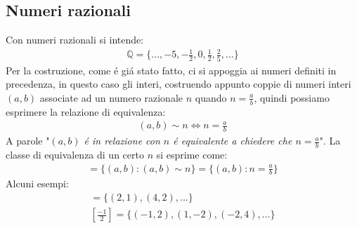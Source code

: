 \documentclass[twoside]{article} %
\begin{document}
	\newpage	
	\subsection{Numeri razionali}
	Con numeri razionali si intende:
	\begin{gather*}
	 	\mathbb{Q}=\Big\{...,-5,-\frac{1}{2},0,\frac{1}{2},\frac{2}{5}, ...\Big\}
	 \end{gather*}
	 Per la costruzione, come \'e gi\'a stato fatto, ci si appoggia ai numeri definiti in precedenza, in questo caso gli interi, costruendo appunto coppie di numeri interi $(a,b)$ associate ad un numero razionale $n$ quando $n=\frac{a}{b}$, quindi possiamo esprimere la relazione di equivalenza:
	 \begin{gather*}
	 	(a,b)\sim n\Leftrightarrow n=\frac{a}{b}
	 \end{gather*}
	 A parole "\textit{$(a,b)$ \'e in relazione con $n$ \'e equivalente a chiedere che $n=\frac{a}{b}$}". La classe di equivalenza di un certo $n$ si esprime come:
	\begin{gather*}
		[n]=\{(a,b):(a,b)\sim n\}=\Big\{(a,b):n=\frac{a}{b}\Big\}
	\end{gather*}		
	Alcuni esempi:
	\begin{gather*}
		[2]=\Big\{ (2,1), (4,2),...\Big\} \\
		\left[\frac{-1}{2}\right]=\Big\{(-1,2),(1,-2), (-2,4),...\Big\}
	\end{gather*} \\
\end{document}
